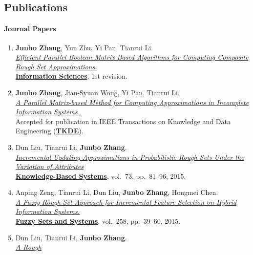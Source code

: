 \documentclass[]{article}
\begin{document}
\subsection{Publications}\label{publications}

\paragraph{Journal Papers}\label{journal-papers}

\begin{enumerate}
\def\labelenumi{\arabic{enumi}.}
\item
  \textbf{Junbo Zhang}, Yun Zhu, Yi Pan, Tianrui Li.\\
  \href{}{\emph{Efficient Parallel Boolean Matrix Based Algorithms for
  Computing Composite Rough Set Approximations.}}\\
  \href{http://www.journals.elsevier.com/information-sciences}{\textbf{Information
  Sciences}}, 1st revision.
\item
  \textbf{Junbo Zhang}, Jian-Syuan Wong, Yi Pan, Tianrui Li.\\
  \href{http://dx.doi.org/10.1109/TKDE.2014.2330821}{\emph{A Parallel
  Matrix-based Method for Computing Approximations in Incomplete
  Information Systems.}}\\ Accepted for publication in IEEE Transactions
  on Knowledge and Data Engineering
  (\href{http://www.computer.org/portal/web/tkde}{\textbf{TKDE}}).
\item
  Dun Liu, Tianrui Li, \textbf{Junbo Zhang}.\\
  \href{http://dx.doi.org/10.1016/j.knosys.2014.09.008}{\emph{Incremental
  Updating Approximations in Probabilistic Rough Sets Under the
  Variation of Attributes}}\\
  \href{http://www.journals.elsevier.com/knowledge-based-systems}{\textbf{Knowledge-Based
  Systems}}, vol.~73, pp.~81--96, 2015.
\item
  Anping Zeng, Tianrui Li, Dun Liu, \textbf{Junbo Zhang}, Hongmei
  Chen.\\ \href{http://dx.doi.org/10.1016/j.fss.2014.08.014}{\emph{A
  Fuzzy Rough Set Approach for Incremental Feature Selection on Hybrid
  Information Systems.}}\\
  \href{http://www.journals.elsevier.com/fuzzy-sets-and-systems}{\textbf{Fuzzy
  Sets and Systems}}, vol.~258, pp.~39--60, 2015.
\item
  Dun Liu, Tianrui Li, \textbf{Junbo Zhang}.\\
  \href{http://dx.doi.org/10.1016/j.ijar.2014.05.009}{\emph{A Rough
}}
\end{enumerate}
\end{document}
